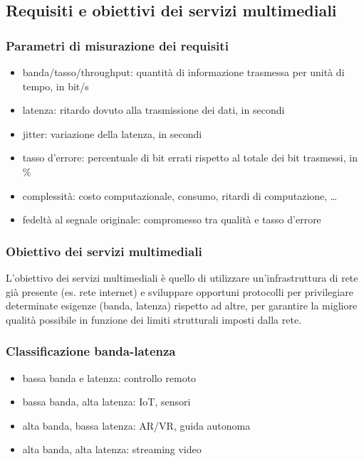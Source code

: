\subsection{Requisiti e obiettivi dei servizi multimediali}
\subsubsection*{Parametri di misurazione dei requisiti}
\begin{itemize}
	\item banda/tasso/throughput: quantità di informazione trasmessa per unità di tempo, in bit/s
	\item latenza: ritardo dovuto alla trasmissione dei dati, in secondi
	\item jitter: variazione della latenza, in secondi
	\item tasso d'errore: percentuale di bit errati rispetto al totale dei bit trasmessi, in \%
	\item complessità: costo computazionale, consumo, ritardi di computazione, \dots
	\item fedeltà al segnale originale: compromesso tra qualità e tasso d'errore
\end{itemize}

\subsubsection*{Obiettivo dei servizi multimediali}
L'obiettivo dei servizi multimediali è quello di utilizzare un'infrastruttura di rete già presente (es. rete internet)
e sviluppare opportuni protocolli per privilegiare determinate esigenze (banda, latenza) rispetto ad altre, per garantire
la migliore qualità possibile in funzione dei limiti strutturali imposti dalla rete.

\subsubsection*{Classificazione banda-latenza}
\begin{center}
	\begin{minipage}{0.44\textwidth}
		\begin{itemize}
			\item bassa banda e latenza: controllo remoto
			\item bassa banda, alta latenza: IoT, sensori
		\end{itemize}
	\end{minipage}
	\hfill
	\begin{minipage}{0.55\textwidth}
		\begin{itemize}
			\item alta banda, bassa latenza: AR/VR, guida autonoma
			\item alta banda, alta latenza: streaming video
		\end{itemize}
	\end{minipage}
\end{center}

